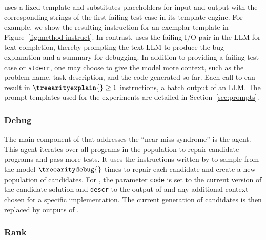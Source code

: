 \instructs{} uses a fixed template and substitutes placeholders for input and output with the corresponding strings of the first failing test case in its template engine.
For example, we show the resulting instruction for an exemplar template in Figure~\ref{fig:method-instruct}.
In contrast, \instructllm{} uses the failing I/O pair in the LLM for text completion, thereby prompting the text LLM to produce the bug explanation and a summary for debugging. 
In addition to providing a failing test case or \texttt{stderr}, one may choose to give the model \textmodelnoargs{} more context, such as the problem name, task description, and the code generated so far. 
Each call to \textmodelnoargs{} can result in $\treearityexplain{}\ge1$ instructions, a batch output of an LLM.
The prompt templates used for the experiments are detailed in Section~\ref{sec:prompts}.








\subsubsection{Debug}

The main component of \method{} that addresses the ``near-miss syndrome'' is the \debug{} agent.  
This agent iterates over all programs in the population to repair candidate programs and pass more tests. 
It uses the instructions written by \instruct{} to sample from the \debugmodelnoargs{} model $\treearitydebug{}$ times
to repair each candidate and create a new population of \treearity{} candidates.
For \debugmodelnoargs{}, the parameter \texttt{code} is set to the current version of the candidate solution and \texttt{descr} to the output of \instruct{} and any additional context chosen for a specific implementation.
The current generation of candidates is then replaced by \treearity{} outputs of \debug{}.

\subsubsection{Rank}

